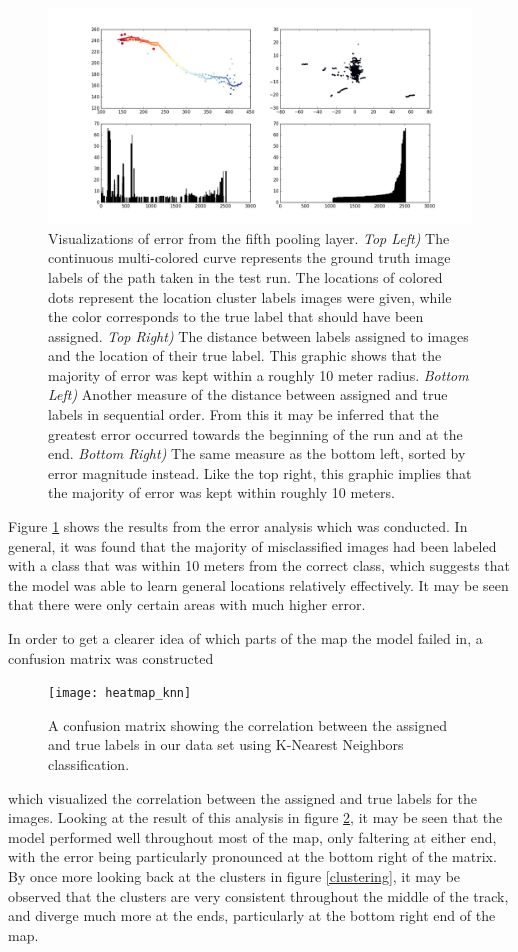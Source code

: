 \documentclass[letterpaper, 12 pt, conference]{ieeeconf}  %
\begin{document}
\begin{figure}[h]
\centering
\includegraphics[scale=0.23]{error_pool5}
\caption{Visualizations of error from the fifth pooling layer. \textit{Top Left)} The continuous multi-colored curve represents the ground truth image labels of the path taken in the test run. The locations of colored dots represent the location cluster labels images were given, while the color corresponds to the true label that should have been assigned. \textit{Top Right)} The distance between labels assigned to images and the location of their true label. This graphic shows that the majority of error was kept within a roughly 10 meter radius. \textit{Bottom Left)} Another measure of the distance between assigned and true labels in sequential order. From this it may be inferred that the greatest error occurred towards the beginning of the run and at the end. \textit{Bottom Right)} The same measure as the bottom left, sorted by error magnitude instead. Like the top right, this graphic implies that the majority of error was kept within roughly 10 meters.}
\label{error_graphs}
\end{figure}

Figure \ref{error_graphs} shows the results from the error analysis which was conducted. In general, it was found that the majority of misclassified images had been labeled with a class that was within 10 meters from the correct class, which suggests that the model was able to learn general locations relatively effectively. It may be seen that there were only certain areas with much higher error. 
\par
In order to get a clearer idea of which parts of the map the model failed in, a confusion matrix was constructed
\begin{figure}[h]
\centering
\texttt{[image: heatmap\_knn]}
\caption{A confusion matrix showing the correlation between the assigned and true labels in our data set using K-Nearest Neighbors classification.}
\label{confusion_matrix}
\end{figure}
which visualized the correlation between the assigned and true labels for the images. Looking at the result of this analysis in figure \ref{confusion_matrix}, it may be seen that the model performed well throughout most of the map, only faltering at either end, with the error being particularly pronounced at the bottom right of the matrix. By once more looking back at the clusters in figure \ref{clustering}, it may be observed that the clusters are very consistent throughout the middle of the track, and diverge much more at the ends, particularly at the bottom right end of the map. 
\end{document}
